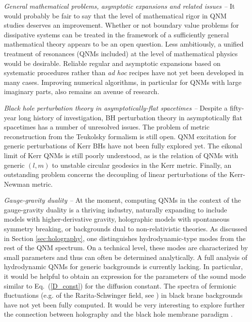 \documentclass[]{iopart}
\begin{document}
\noindent
{\it General mathematical problems, asymptotic expansions and related issues --}
 It would probably be fair to say that the level of mathematical rigor in
QNM studies deserves an improvement. Whether or not boundary value problems for 
dissipative systems can be treated in the framework of a sufficiently general 
mathematical theory appears to be an open question. Less ambitiously, a 
unified treatment of resonances (QNMs included) at the level of mathematical 
physics would be desirable. Reliable regular and asymptotic expansions based on systematic 
procedures rather than {\it ad hoc} recipes have not yet been developed in many cases.
Improving numerical algorithms, in particular for QNMs with large imaginary parts, also 
remains an avenue of research. 

\noindent
{\it Black hole perturbation theory in asymptotically-flat spacetimes --}
Despite a fifty-year long history of investigation, BH perturbation theory in
asymptotically flat spacetimes has a number of unresolved issues.  The problem
of metric reconstruction from the Teukolsky formalism is still open. QNM excitation for generic perturbations of Kerr BHs
have not been fully explored yet. The eikonal limit of Kerr QNMs is still
poorly understood, as is the relation of QNMs with generic $(l,m)$ to unstable
circular geodesics in the Kerr metric. Finally, an outstanding problem
concerns the decoupling of linear perturbations of the Kerr-Newman metric.

\noindent
{\it Gauge-gravity duality --} At the moment, computing QNMs in the context of
the gauge-gravity duality is a thriving industry, naturally expanding to
include models with higher-derivative gravity, holographic models with
spontaneous symmetry breaking, or backgrounds dual to non-relativistic
theories.  As discussed in Section \ref{sec:holography}, one distinguishes
hydrodynamic-type modes from the rest of the QNM spectrum. On a technical
level, these modes are characterized by small parameters and thus can often be
determined analytically.  A full analysis of hydrodynamic QNMs for generic
backgrounds is currently lacking.  In particular, it would be helpful to
obtain an expression for the parameters of the sound mode similar to
Eq.~(\ref{D_const}) for the diffusion constant. The spectra of fermionic
fluctuations (e.g. of the Rarita-Schwinger field, see
\cite{Policastro:2008cx}) in black brane backgrounds have not yet been fully
computed. It would be very interesting to explore further the connection
between holography and the black hole membrane paradigm
\cite{Damour:2008ji,Parikh:1997ma,Starinets:2008fb,Iqbal:2008by}.
\end{document}
